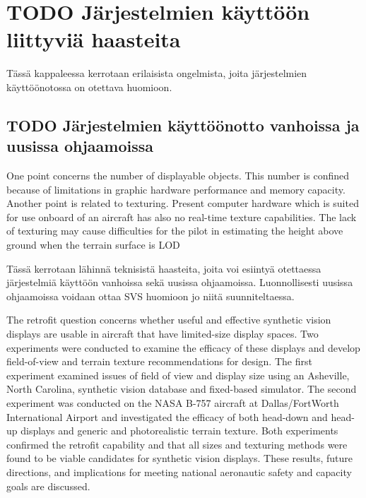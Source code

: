 \documentclass[utf8,bachelor,manualbib]{gradu3}
\begin{document}
\chapter{TODO Järjestelmien käyttöön liittyviä haasteita}

Tässä kappaleessa kerrotaan erilaisista ongelmista, joita järjestelmien käyttöönotossa on otettava huomioon.

\section{TODO Järjestelmien käyttöönotto vanhoissa ja uusissa ohjaamoissa}

One point concerns the number of displayable objects. This
number is confined because of limitations in graphic hardware
performance and memory capacity. Another point is related to
texturing. Present computer hardware which is suited for use
onboard of an aircraft has also no real-time texture capabilities.
The lack of texturing may cause difficulties for the pilot in
estimating the height above ground when the terrain surface is
LOD \citep{mollersachs1994}

Tässä kerrotaan lähinnä teknisistä haasteita, joita voi esiintyä otettaessa järjestelmiä käyttöön vanhoissa sekä uusissa ohjaamoissa. Luonnollisesti uusissa ohjaamoissa voidaan ottaa SVS huomioon jo niitä suunniteltaessa.

The retrofit question concerns whether useful and effective synthetic vision displays
are usable in aircraft that have limited-size display spaces. Two experiments were
conducted to examine the efficacy of these displays and develop field-of-view and
terrain texture recommendations for design. The first experiment examined issues of
field of view and display size using an Asheville, North Carolina, synthetic vision database
and fixed-based simulator. The second experiment was conducted on the
NASA B-757 aircraft at Dallas/FortWorth International Airport and investigated the
efficacy of both head-down and head-up displays and generic and photorealistic terrain
texture. Both experiments confirmed the retrofit capability and that all sizes and
texturing methods were found to be viable candidates for synthetic vision displays.
These results, future directions, and implications for meeting national aeronautic
safety and capacity goals are discussed. \citep{prinzel2004}
\end{document}

